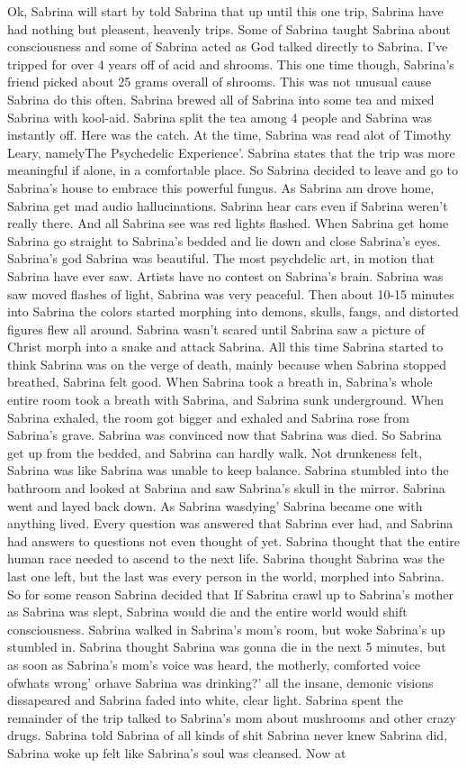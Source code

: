 \documentclass[12pt]{book}
\begin{document}
Ok, Sabrina will start by told Sabrina that up until this one trip, Sabrina have had nothing but pleasent, heavenly trips. Some of Sabrina taught Sabrina about consciousness and some of Sabrina acted as God talked directly to Sabrina. I've tripped for over 4 years off of acid and shrooms. This one time though, Sabrina's friend picked about 25 grams overall of shrooms. This was not unusual cause Sabrina do this often. Sabrina brewed all of Sabrina into some tea and mixed Sabrina with kool-aid. Sabrina split the tea among 4 people and Sabrina was instantly off. Here was the catch. At the time, Sabrina was read alot of Timothy Leary, namelyThe Psychedelic Experience'. Sabrina states that the trip was more meaningful if alone, in a comfortable place. So Sabrina decided to leave and go to Sabrina's house to embrace this powerful fungus. As Sabrina am drove home, Sabrina get mad audio hallucinations. Sabrina hear cars even if Sabrina weren't really there. And all Sabrina see was red lights flashed. When Sabrina get home Sabrina go straight to Sabrina's bedded and lie down and close Sabrina's eyes. Sabrina's god Sabrina was beautiful. The most psychdelic art, in motion that Sabrina have ever saw. Artists have no contest on Sabrina's brain. Sabrina was saw moved flashes of light, Sabrina was very peaceful. Then about 10-15 minutes into Sabrina the colors started morphing into demons, skulls, fangs, and distorted figures flew all around. Sabrina wasn't scared until Sabrina saw a picture of Christ morph into a snake and attack Sabrina. All this time Sabrina started to think Sabrina was on the verge of death, mainly because when Sabrina stopped breathed, Sabrina felt good. When Sabrina took a breath in, Sabrina's whole entire room took a breath with Sabrina, and Sabrina sunk underground. When Sabrina exhaled, the room got bigger and exhaled and Sabrina rose from Sabrina's grave. Sabrina was convinced now that Sabrina was died. So Sabrina get up from the bedded, and Sabrina can hardly walk. Not drunkeness felt, Sabrina was like Sabrina was unable to keep balance. Sabrina stumbled into the bathroom and looked at Sabrina and saw Sabrina's skull in the mirror. Sabrina went and layed back down. As Sabrina wasdying' Sabrina became one with anything lived. Every question was answered that Sabrina ever had, and Sabrina had answers to questions not even thought of yet. Sabrina thought that the entire human race needed to ascend to the next life. Sabrina thought Sabrina was the last one left, but the last was every person in the world, morphed into Sabrina. So for some reason Sabrina decided that If Sabrina crawl up to Sabrina's mother as Sabrina was slept, Sabrina would die and the entire world would shift consciousness. Sabrina walked in Sabrina's mom's room, but woke Sabrina's up stumbled in. Sabrina thought Sabrina was gonna die in the next 5 minutes, but as soon as Sabrina's mom's voice was heard, the motherly, comforted voice ofwhats wrong' orhave Sabrina was drinking?' all the insane, demonic visions dissapeared and Sabrina faded into white, clear light. Sabrina spent the remainder of the trip talked to Sabrina's mom about mushrooms and other crazy drugs. Sabrina told Sabrina of all kinds of shit Sabrina never knew Sabrina did, Sabrina woke up felt like Sabrina's soul was cleansed. Now at 
\end{document}
